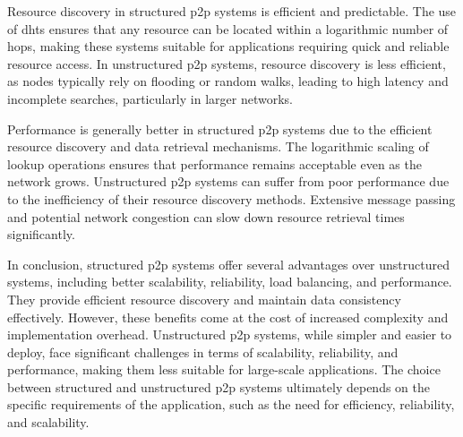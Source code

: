 Resource discovery in structured \gls{p2p} systems is efficient and predictable.
The use of \glspl{dht} ensures that any resource can be located within a logarithmic number of hops, making these systems suitable for applications requiring quick and reliable resource access.
In unstructured \gls{p2p} systems, resource discovery is less efficient, as nodes typically rely on flooding or random walks, leading to high latency and incomplete searches, particularly in larger networks.

Performance is generally better in structured \gls{p2p} systems due to the efficient resource discovery and data retrieval mechanisms.
The logarithmic scaling of lookup operations ensures that performance remains acceptable even as the network grows.
Unstructured \gls{p2p} systems can suffer from poor performance due to the inefficiency of their resource discovery methods.
Extensive message passing and potential network congestion can slow down resource retrieval times significantly.

In conclusion, structured \gls{p2p} systems offer several advantages over unstructured systems, including better scalability, reliability, load balancing, and performance.
They provide efficient resource discovery and maintain data consistency effectively.
However, these benefits come at the cost of increased complexity and implementation overhead.
Unstructured \gls{p2p} systems, while simpler and easier to deploy, face significant challenges in terms of scalability, reliability, and performance, making them less suitable for large-scale applications.
The choice between structured and unstructured \gls{p2p} systems ultimately depends on the specific requirements of the application, such as the need for efficiency, reliability, and scalability.
